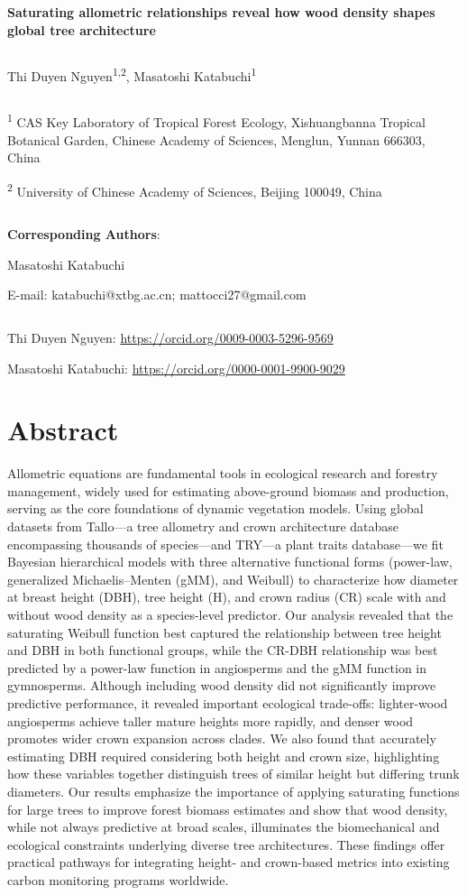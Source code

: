 \documentclass[
  12pt,
  letterpaper,
  DIV=11,
  numbers=noendperiod]{scrartcl}
\author{}
\date{}
\begin{document}
\textbf{Saturating allometric relationships reveal how wood density
shapes global tree architecture}

\[ \]

Thi Duyen Nguyen\textsuperscript{1,2}, Masatoshi
Katabuchi\textsuperscript{1}

\[ \]

\textsuperscript{1} CAS Key Laboratory of Tropical Forest Ecology,
Xishuangbanna Tropical Botanical Garden, Chinese Academy of Sciences,
Menglun, Yunnan 666303, China

\textsuperscript{2} University of Chinese Academy of Sciences, Beijing
100049, China

\[ \]

\textbf{Corresponding Authors}:

Masatoshi Katabuchi

E-mail: katabuchi@xtbg.ac.cn; mattocci27@gmail.com

\[ \]

Thi Duyen Nguyen: \url{https://orcid.org/0009-0003-5296-9569}

Masatoshi Katabuchi: \url{https://orcid.org/0000-0001-9900-9029}

\section*{Abstract}\label{abstract}

Allometric equations are fundamental tools in ecological research and
forestry management, widely used for estimating above-ground biomass and
production, serving as the core foundations of dynamic vegetation
models. Using global datasets from Tallo---a tree allometry and crown
architecture database encompassing thousands of species---and TRY---a
plant traits database---we fit Bayesian hierarchical models with three
alternative functional forms (power-law, generalized Michaelis--Menten
(gMM), and Weibull) to characterize how diameter at breast height (DBH),
tree height (H), and crown radius (CR) scale with and without wood
density as a species-level predictor. Our analysis revealed that the
saturating Weibull function best captured the relationship between tree
height and DBH in both functional groups, while the CR-DBH relationship
was best predicted by a power-law function in angiosperms and the gMM
function in gymnosperms. Although including wood density did not
significantly improve predictive performance, it revealed important
ecological trade-offs: lighter-wood angiosperms achieve taller mature
heights more rapidly, and denser wood promotes wider crown expansion
across clades. We also found that accurately estimating DBH required
considering both height and crown size, highlighting how these variables
together distinguish trees of similar height but differing trunk
diameters. Our results emphasize the importance of applying saturating
functions for large trees to improve forest biomass estimates and show
that wood density, while not always predictive at broad scales,
illuminates the biomechanical and ecological constraints underlying
diverse tree architectures. These findings offer practical pathways for
integrating height- and crown-based metrics into existing carbon
monitoring programs worldwide.
\end{document}
